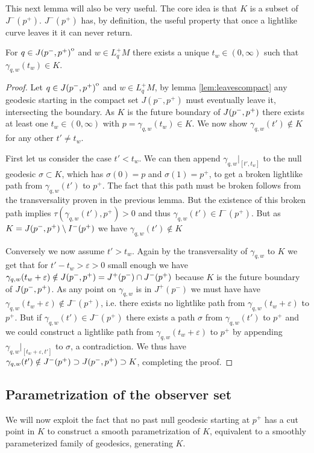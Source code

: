 This next lemma will also be very useful. The core idea is that $K$ is a subset of $J^-(p^+)$. $J^-(p^+)$ has, by definition, the useful property that once a lightlike curve leaves it it can never return.
\begin{lemma}\label{lem:hitsonce}
    For $q\in {\kern0ptJ(p^-,p^+)}^{\mathrm{o}}$ and $w\in L^+_qM$ there exists a unique $t_w\in (0,\infty)$ such that $\gamma_{q,w}(t_w)\in K$.
\end{lemma}
\begin{proof}
    Let $q\in {\kern0ptJ(p^-,p^+)}^{\mathrm{o}}$ and $w\in L^+_qM$, by lemma \ref{lem:leavescompact} any geodesic starting in the compact set $J(p^-,p^+)$ must eventually leave it, intersecting the boundary. As $K$ is the future boundary of $J(p^-,p^+)$ there exists at least one $t_w\in (0,\infty)$ with $p=\gamma_{q,w}(t_w)\in K$. We now show $\gamma_{q,w}(t')\notin K$ for any other $t'\neq t_w$.

    First let us consider the case $t'<t_w$. We can then append $\gamma_{q,w}\rvert_{[t',t_w]}$ to the null geodesic $\sigma\subset K$, which has $\sigma(0)=p$ and $\sigma(1)=p^+$, to get a broken lightlike path from $\gamma_{q,w}(t')$ to $p^+$. The fact that this path must be broken follows from the transversality proven in the previous lemma. But the existence of this broken path implies $\tau(\gamma_{q,w}(t'),p^+)>0$ and thus $\gamma_{q,w}(t')\in I^-(p^+)$. But as $K=J(p^-,p^+)\setminus I^-(p^+)$ we have $\gamma_{q,w}(t')\notin K$

    Conversely we now assume $t'>t_w$. Again by the transversality of $\gamma_{q,w}$ to $K$ we get that for $t'-t_w>\varepsilon>0$ small enough we have $\gamma_{q,w}(t_w+\varepsilon)\notin J(p^-,p^+)=J^+(p^-)\cap J^-(p^+)$ because $K$ is the future boundary of $J(p^-,p^+)$. As any point on $\gamma_{q,w}$ is in $J^+(p^-)$ we must have have $\gamma_{q,w}(t_w+\varepsilon) \notin J^-(p^+)$, i.e. there exists no lightlike path from $\gamma_{q,w}(t_w+\varepsilon)$ to $p^+$. But if $\gamma_{q,w}(t')\in J^-(p^+)$ there exists a path $\sigma$ from $\gamma_{q,w}(t')$ to $p^+$ and we could construct a lightlike path from $\gamma_{q,w}(t_w+\varepsilon)$ to $p^+$ by appending $\gamma_{q,w}\rvert_{[t_w+\varepsilon,t']}$ to  $\sigma$, a contradiction. We thus have $\gamma_{q,w}(t')\notin J^-(p^+)\supset J(p^-,p^+)\supset K$, completing the proof.
\end{proof}

\subsection{Parametrization of the observer set}
We will now exploit the fact that no past null geodesic starting at $p^+$ has a cut point in $K$ to construct a smooth parametrization of $K$, equivalent to a smoothly parameterized family of geodesics, generating $K$.


